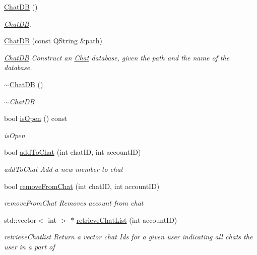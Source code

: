 \begin{DoxyCompactItemize}
\item 
\hyperlink{classChatDB_aa99e58930a74b5b873280af970ba9fbc}{Chat\+DB} ()
\begin{DoxyCompactList}\small\item\em \hyperlink{classChatDB}{Chat\+DB}. \end{DoxyCompactList}\item 
\hyperlink{classChatDB_a1809a8b752ce9a622c9092c632d5154a}{Chat\+DB} (const Q\+String \&path)
\begin{DoxyCompactList}\small\item\em \hyperlink{classChatDB}{Chat\+DB} Construct an \hyperlink{classChat}{Chat} database, given the path and the name of the database. \end{DoxyCompactList}\item 
\hyperlink{classChatDB_a89ed15f30c3c77cdead9573bea8d394e}{$\sim$\+Chat\+DB} ()
\begin{DoxyCompactList}\small\item\em $\sim$\+Chat\+DB \end{DoxyCompactList}\item 
bool \hyperlink{classChatDB_af501cc1ccfa04f5a9c22f34487b52de3}{is\+Open} () const 
\begin{DoxyCompactList}\small\item\em is\+Open \end{DoxyCompactList}\item 
bool \hyperlink{classChatDB_ac2fd84bd865798bbca96da5a58acd160}{add\+To\+Chat} (int chat\+ID, int account\+ID)
\begin{DoxyCompactList}\small\item\em add\+To\+Chat Add a new member to chat \end{DoxyCompactList}\item 
bool \hyperlink{classChatDB_a1543cbf41c9cf2704e6d5440ff72f15d}{remove\+From\+Chat} (int chat\+ID, int account\+ID)
\begin{DoxyCompactList}\small\item\em remove\+From\+Chat Removes account from chat \end{DoxyCompactList}\item 
std\+::vector$<$ int $>$ $\ast$ \hyperlink{classChatDB_ab23373a16930a0822018ccf8a48c47d5}{retrieve\+Chat\+List} (int account\+ID)
\begin{DoxyCompactList}\small\item\em retrieve\+Chatlist Return a vector chat Ids for a given user indicating all chats the user in a part of \end{DoxyCompactList}\item 

\end{DoxyCompactItemize}

